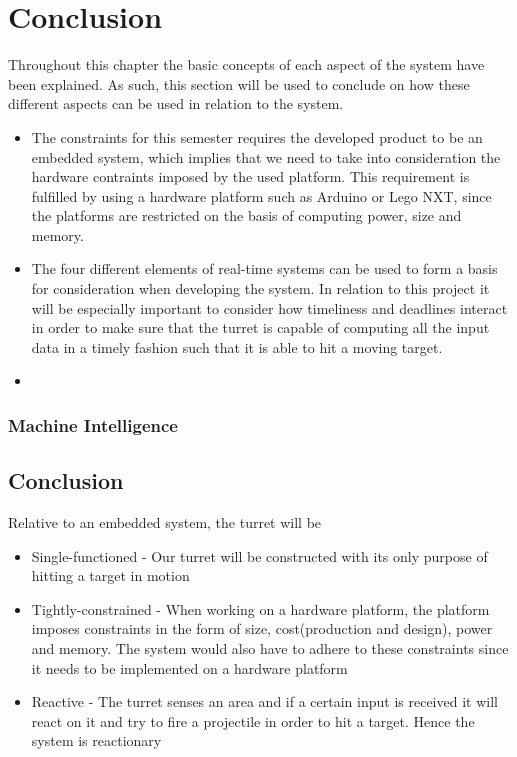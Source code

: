 \section{Conclusion}\label{EmbConc} 
Throughout this chapter the basic concepts of each aspect of the system have
been explained. As such, this section will be used to conclude on how these
different aspects can be used in relation to the \name system.

\begin{itemize}
  \item The constraints for this semester requires the developed product to be
  an embedded system, which implies that we need to take into consideration
  the hardware contraints imposed by the used platform. This requirement is
  fulfilled by using a hardware platform such as Arduino or Lego NXT, since the
  platforms are restricted on the basis of computing power, size and memory.
  \item The four different elements of real-time systems can be used to form a
  basis for consideration when developing the system. In relation to this
  project it will be especially important to consider how timeliness and
  deadlines interact in order to make sure that the turret is capable of
  computing all the input data in a timely fashion such that it is able to hit a
  moving target.
  \item 
\end{itemize}

\subsubsection{Machine Intelligence}

\subsection{Conclusion}
Relative to an embedded system, the turret will be
\begin{itemize}
  \item Single-functioned - Our turret will be constructed with its only purpose of hitting a target in motion
  \item Tightly-constrained - When working on a hardware platform, the platform imposes constraints in the form of
  size, cost(production and design), power and memory. The system would also have to adhere to these constraints since it
  needs to be implemented on a hardware platform
  \item Reactive - The turret senses an area and if a certain input is received it will react on it and try to fire a projectile
  in order to hit a target. Hence the system is reactionary
\end{itemize}
